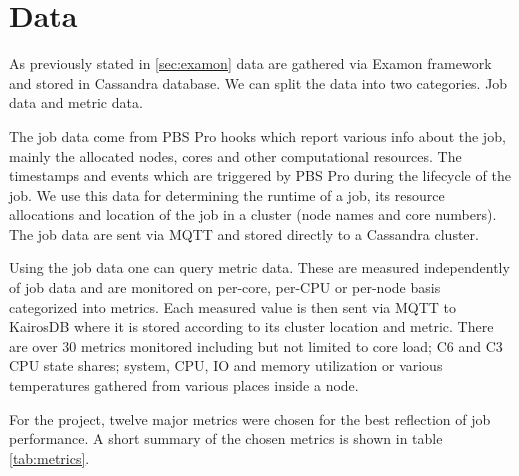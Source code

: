 \section{Data}
\label{sec:data}

As previously stated in \ref{sec:examon} data are gathered via Examon framework and stored in Cassandra database. We can split the data into two categories. Job data and metric data.

The job data come from PBS Pro\cite{PBSProAdminGuide14} hooks which report various info about the job, mainly the allocated nodes, cores and other computational resources. The timestamps and events which are triggered by PBS Pro during the lifecycle of the job. We use this data for determining the runtime of a job, its resource allocations and location of the job in a cluster (node names and core numbers). The job data are sent via MQTT and stored directly to a Cassandra cluster.

Using the job data one can query metric data. These are measured independently of job data and are monitored on per-core, per-CPU or per-node basis categorized into metrics. Each measured value is then sent via MQTT to KairosDB where it is stored according to its cluster location and metric. There are over 30 metrics monitored including but not limited to core load; C6 and C3 CPU state shares; system, CPU, IO and memory utilization or various temperatures gathered from various places inside a node.

For the project, twelve major metrics were chosen for the best reflection of job performance. A short summary of the chosen metrics is shown in table \ref{tab:metrics}.

